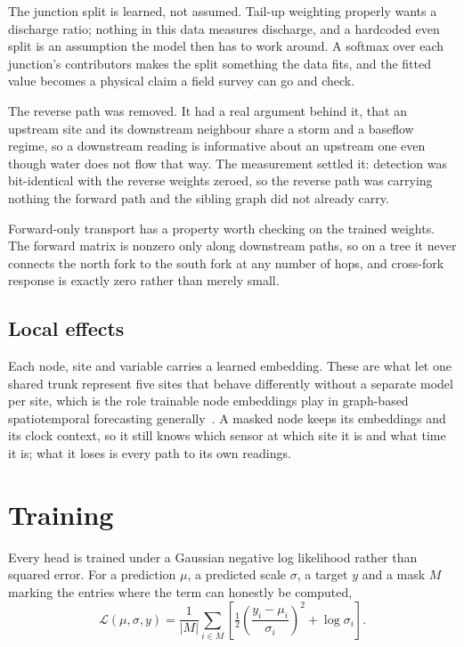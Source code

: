 \documentclass{article}
\begin{document}
The junction split is learned, not assumed. Tail-up weighting properly wants a
discharge ratio; nothing in this data measures discharge, and a hardcoded even
split is an assumption the model then has to work around. A softmax over each
junction's contributors makes the split something the data fits, and the fitted
value becomes a physical claim a field survey can go and check.

The reverse path was removed. It had a real argument behind it, that an
upstream site and its downstream neighbour share a storm and a baseflow regime,
so a downstream reading is informative about an upstream one even though water
does not flow that way. The measurement settled it: detection was bit-identical
with the reverse weights zeroed, so the reverse path was carrying nothing the
forward path and the sibling graph did not already carry.

Forward-only transport has a property worth checking on the trained weights.
The forward matrix is nonzero only along downstream paths, so on a tree it
never connects the north fork to the south fork at any number of hops, and
cross-fork response is exactly zero rather than merely small.

\subsection{Local effects}
\label{sec:embeddings}

Each node, site and variable carries a learned embedding. These are what let one
shared trunk represent five sites that behave differently without a separate
model per site, which is the role trainable node embeddings play in graph-based
spatiotemporal forecasting generally~\citep{cini2023local}. A masked node keeps
its embeddings and its clock context, so it still knows which sensor at which
site it is and what time it is; what it loses is every path to its own readings.

\section{Training}
\label{sec:training}

Every head is trained under a Gaussian negative log likelihood rather than
squared error. For a prediction $\mu$, a predicted scale $\sigma$, a target $y$
and a mask $M$ marking the entries where the term can honestly be computed,
\begin{equation}
  \mathcal{L}(\mu, \sigma, y) = \frac{1}{|M|} \sum_{i \in M}
    \left[ \tfrac{1}{2} \left( \frac{y_i - \mu_i}{\sigma_i} \right)^{2} + \log \sigma_i \right].
\end{equation}
\end{document}

